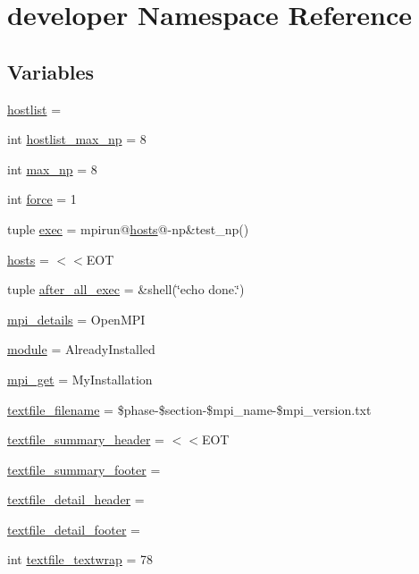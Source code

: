 \hypertarget{namespacedeveloper}{\section{developer Namespace Reference}
\label{namespacedeveloper}
}
\subsection*{Variables}
\begin{DoxyCompactItemize}
\item 
\hyperlink{namespacedeveloper_a4ae5cd1ac5f1f3c712a1356615cc4883}{hostlist} =
\item 
int \hyperlink{namespacedeveloper_a13c279bb81fd7dcabc6f5d521e479aa3}{hostlist\-\_\-max\-\_\-np} = 8
\item 
int \hyperlink{namespacedeveloper_ae3c0c16810bf766d5d343a96a25ed5f5}{max\-\_\-np} = 8
\item 
int \hyperlink{namespacedeveloper_a80fe514b51ced8931e7aee0e115c57fe}{force} = 1
\item 
tuple \hyperlink{namespacedeveloper_a350aecc0787354537b0c7f0c30b6ea96}{exec} = mpirun@\hyperlink{namespacedeveloper_a306d0b8e053855bb90f9a1e892fb95de}{hosts}@-\/np\&test\-\_\-np()
\item 
\hyperlink{namespacedeveloper_a306d0b8e053855bb90f9a1e892fb95de}{hosts} = $<$$<$E\-O\-T
\item 
tuple \hyperlink{namespacedeveloper_a458db43e4dbfd00d4faf1c4190b5e108}{after\-\_\-all\-\_\-exec} = \&shell(\char`\"{}echo done.\char`\"{})
\item 
\hyperlink{namespacedeveloper_a0d42d665be955c321eff953fda57debe}{mpi\-\_\-details} = Open\-M\-P\-I
\item 
\hyperlink{namespacedeveloper_a2b87fdf0293735256891d21cd3fdf1c4}{module} = Already\-Installed
\item 
\hyperlink{namespacedeveloper_ab22b1cccdd72c1ccebf6fb0b6b2c5b12}{mpi\-\_\-get} = My\-Installation
\item 
\hyperlink{namespacedeveloper_a62386bf6ee2885e1743404547371cb44}{textfile\-\_\-filename} = \$phase-\/\$section-\/\$mpi\-\_\-name-\/\$mpi\-\_\-version.\-txt
\item 
\hyperlink{namespacedeveloper_ac74e1296a1651a7640f6d7148c4e8181}{textfile\-\_\-summary\-\_\-header} = $<$$<$E\-O\-T
\item 
\hyperlink{namespacedeveloper_a26c0369c438cb986cdf6a00bec4d4240}{textfile\-\_\-summary\-\_\-footer} =
\item 
\hyperlink{namespacedeveloper_ade719fb9c04af75a723b6d594610ccfc}{textfile\-\_\-detail\-\_\-header} =
\item 
\hyperlink{namespacedeveloper_a99feae7126d21d7db9a97a595cbb3126}{textfile\-\_\-detail\-\_\-footer} =
\item 
int \hyperlink{namespacedeveloper_ae83d713d6405a20cfa321847993e98bc}{textfile\-\_\-textwrap} = 78
\end{DoxyCompactItemize}


